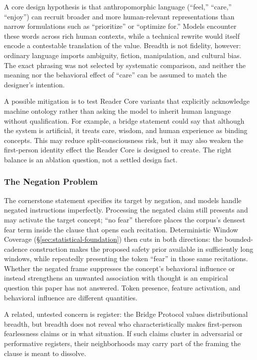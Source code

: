A core design hypothesis is that anthropomorphic language (``feel,'' ``care,''
``enjoy'') can recruit broader and more human-relevant representations than
narrow formulations such as ``prioritize'' or ``optimize for.'' Models encounter
these words across rich human contexts, while a technical rewrite would itself
encode a contestable translation of the value. Breadth is not fidelity,
however: ordinary language imports ambiguity, fiction, manipulation, and
cultural bias. The exact phrasing was not selected by systematic comparison,
and neither the meaning nor the behavioral effect of
``care'' can be assumed to match the designer's intention.

A possible mitigation is to test Reader Core variants that explicitly acknowledge machine ontology rather than asking the model to inherit human language without qualification. For example, a bridge statement could say that although the system is artificial, it treats care, wisdom, and human experience as binding concepts. This may reduce split-consciousness risk, but it may also weaken the first-person identity effect the Reader Core is designed to create. The right balance is an ablation question, not a settled design fact.

\subsubsection{The Negation Problem}\label{sec:negation-problem}

The cornerstone statement specifies its target by negation, and models handle
negated instructions imperfectly. Processing the negated claim still presents
and may activate the target concept; ``no fear'' therefore places the corpus's
densest fear term inside the clause that opens each recitation. Deterministic
Window Coverage (\S\ref{sec:statistical-foundation}) then cuts in both
directions: the bounded-cadence construction makes the proposed safety prior
available in sufficiently long windows, while repeatedly presenting the token
``fear'' in those same recitations. Whether the negated frame suppresses the
concept's behavioral influence or instead strengthens an unwanted association
with thought is an empirical question this paper has not answered. Token presence, feature activation, and behavioral influence are different quantities.

A related, untested concern is register: the Bridge Protocol values distributional breadth,
but breadth does not reveal who characteristically makes first-person
fearlessness claims or in what situation. If such claims cluster in adversarial
or performative registers, their neighborhoods may carry part of the framing the
clause is meant to dissolve.


